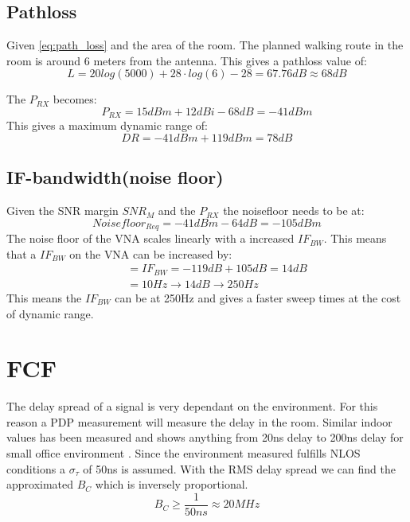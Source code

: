 \subsection{Pathloss}
Given \autoref{eq:path_loss} and the area of the room. The planned walking route in the room is around 6 meters from the antenna. This gives a pathloss value of:
\begin{equation}
L = 20log (5000) + 28 \cdot log(6)-28 = 67.76dB \approx 68dB
\label{eq:path_loss}
\end{equation}

The $P_{RX}$ becomes:
\begin{equation}
P_{RX} = 15dBm + 12dBi - 68dB = -41dBm
\end{equation}
This gives a maximum dynamic range of:
\begin{equation}
DR = -41dBm+119dBm = 78dB
\end{equation}


\subsection{IF-bandwidth(noise floor)}
Given the SNR margin $SNR_{M}$ and the $P_{RX}$ the noisefloor needs to be at:
\begin{equation}
Noisefloor_{Req} = -41dBm-64dB = -105dBm 
\end{equation}
The noise floor of the \gls{VNA} scales linearly with a increased $IF_{BW}$\citep{PNA_scale}. This means that a $IF_{BW}$ on the \gls{VNA} can be increased by:
\begin{equation}
\begin{split}
&= IF_{BW} = -119dB+105dB = 14dB \\
          \quad &= 10Hz \rightarrow 14dB \rightarrow 250Hz
\end{split}
\end{equation}
This means the $IF_{BW}$ can be at 250Hz and gives a faster sweep times at the cost of dynamic range.
\section{FCF}
The delay spread of a signal is very dependant on the environment. For this reason a PDP measurement will measure the delay in the room. Similar indoor values has been measured and shows anything from 20ns delay to 200ns delay for small office environment \citep{indoor_delay}. Since the environment  measured fulfills NLOS conditions a $\sigma_{\tau}$ of 50ns is assumed. With the RMS delay spread we can find the approximated $B_C$ which is inversely proportional. 
\begin{equation}
B_C \geq \frac{1}{50ns} \approx 20MHz
\label{CohBW}
\end{equation}
